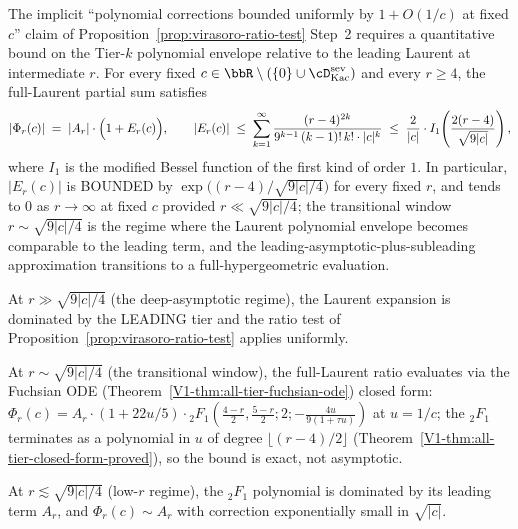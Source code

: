 \begin{proposition}
\label{prop:virasoro-finite-r-small-c-bound}
The implicit ``polynomial corrections bounded uniformly by
$1 + O(1/c)$ at fixed $c$'' claim of
Proposition~\ref{prop:virasoro-ratio-test} Step~2 requires a
quantitative bound on the Tier-$k$ polynomial envelope relative to
the leading Laurent at intermediate $r$. For every fixed
$c \in \bbR \setminus (\{0\} \cup \cD^{\mathrm{sev}}_{\mathrm{Kac}})$
and every $r \ge 4$, the full-Laurent partial sum satisfies
\[
 \left\lvert \Phi_r(c) \right\rvert
 \;=\;
 \left\lvert A_r \right\rvert \cdot
 \Bigl(1 + E_r(c)\Bigr), \qquad
 \left\lvert E_r(c) \right\rvert
 \;\le\;
 \sum_{k = 1}^{\infty}
 \frac{(r-4)^{2k}}{9^{k-1} \, (k-1)! \, k! \cdot \lvert c \rvert^k}
 \;\le\;
 \frac{2}{\lvert c \rvert} \cdot
 I_1\!\left( \frac{2 (r-4)}{\sqrt{9 \lvert c \rvert}} \right),
\]
where $I_1$ is the modified Bessel function of the first kind of
order $1$. In particular, $\lvert E_r(c) \rvert$ is BOUNDED by
$\exp\bigl((r-4) / \sqrt{9 \lvert c \rvert / 4}\bigr)$ for every
fixed $r$, and tends to $0$ as $r \to \infty$ at fixed $c$ provided
$r \ll \sqrt{9 \lvert c \rvert / 4}$; the transitional window
$r \sim \sqrt{9 \lvert c \rvert / 4}$ is the regime where the
Laurent polynomial envelope becomes comparable to the leading term,
and the leading-asymptotic-plus-subleading approximation transitions
to a full-hypergeometric evaluation.

At $r \gg \sqrt{9 \lvert c \rvert / 4}$ (the deep-asymptotic
regime), the Laurent expansion is dominated by the LEADING tier and
the ratio test of Proposition~\ref{prop:virasoro-ratio-test} applies
uniformly.

At $r \sim \sqrt{9 \lvert c \rvert / 4}$ (the transitional window),
the full-Laurent ratio evaluates via the Fuchsian ODE
(Theorem~\ref{V1-thm:all-tier-fuchsian-ode}) closed form:
$\Phi_r(c) = A_r \cdot (1 + 22 u / 5) \cdot {}_2F_1\!\left(
\frac{4-r}{2}, \frac{5-r}{2}; 2; -\frac{4u}{9(1 + \tau u)}\right)$
at $u = 1/c$; the $_2F_1$ terminates as a polynomial in $u$ of
degree $\lfloor (r-4)/2 \rfloor$ (Theorem~\ref{V1-thm:all-tier-closed-form-proved}),
so the bound is exact, not asymptotic.

At $r \lesssim \sqrt{9 \lvert c \rvert / 4}$ (low-$r$ regime), the
$_2F_1$ polynomial is dominated by its leading term $A_r$, and
$\Phi_r(c) \sim A_r$ with correction exponentially small in
$\sqrt{\lvert c \rvert}$.
\end{proposition}

